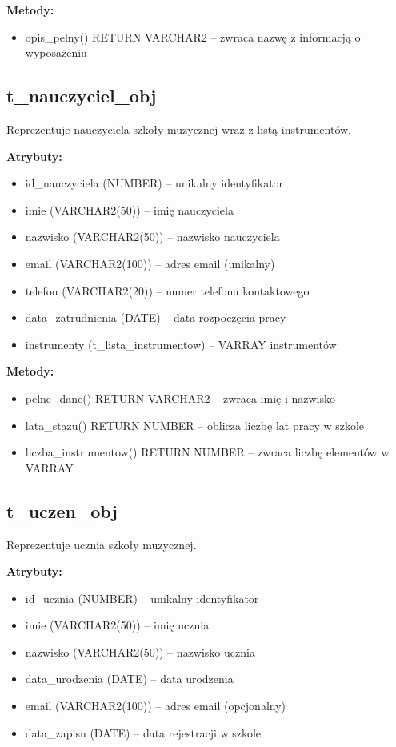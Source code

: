 \documentclass[12pt,a4paper]{article}
\begin{document}
\textbf{Metody:}
\begin{itemize}[nosep]
    \item opis\_pelny() RETURN VARCHAR2 -- zwraca nazwę z informacją o wyposażeniu
\end{itemize}

\subsection{t\_nauczyciel\_obj}

Reprezentuje nauczyciela szkoły muzycznej wraz z listą instrumentów.

\textbf{Atrybuty:}
\begin{itemize}[nosep]
    \item id\_nauczyciela (NUMBER) -- unikalny identyfikator
    \item imie (VARCHAR2(50)) -- imię nauczyciela
    \item nazwisko (VARCHAR2(50)) -- nazwisko nauczyciela
    \item email (VARCHAR2(100)) -- adres email (unikalny)
    \item telefon (VARCHAR2(20)) -- numer telefonu kontaktowego
    \item data\_zatrudnienia (DATE) -- data rozpoczęcia pracy
    \item instrumenty (t\_lista\_instrumentow) -- VARRAY instrumentów
\end{itemize}

\textbf{Metody:}
\begin{itemize}[nosep]
    \item pelne\_dane() RETURN VARCHAR2 -- zwraca imię i nazwisko
    \item lata\_stazu() RETURN NUMBER -- oblicza liczbę lat pracy w szkole
    \item liczba\_instrumentow() RETURN NUMBER -- zwraca liczbę elementów w VARRAY
\end{itemize}

\subsection{t\_uczen\_obj}

Reprezentuje ucznia szkoły muzycznej.

\textbf{Atrybuty:}
\begin{itemize}[nosep]
    \item id\_ucznia (NUMBER) -- unikalny identyfikator
    \item imie (VARCHAR2(50)) -- imię ucznia
    \item nazwisko (VARCHAR2(50)) -- nazwisko ucznia
    \item data\_urodzenia (DATE) -- data urodzenia
    \item email (VARCHAR2(100)) -- adres email (opcjonalny)
    \item data\_zapisu (DATE) -- data rejestracji w szkole
\end{itemize}
\end{document}
